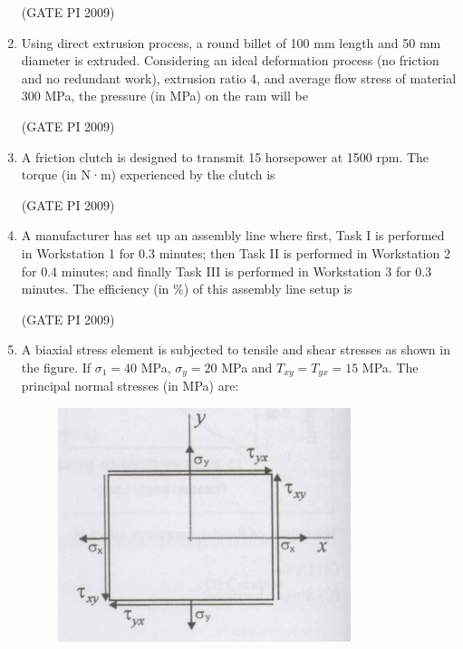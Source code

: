 \documentclass[journal,12pt,onecolumn]{IEEEtran}
\theoremstyle{remark}
\begin{document}
\begin{enumerate}
\hfill (GATE PI 2009)
\item Using direct extrusion process, a round billet of 100 mm length and 50 mm diameter is extruded. Considering an ideal deformation process (no friction and no redundant work), extrusion ratio 4, and average flow stress of material 300 MPa, the pressure (in MPa) on the ram will be
\begin{enumerate}
\end{enumerate}
\hfill (GATE PI 2009)
\item A friction clutch is designed to transmit 15 horsepower at 1500 rpm. The torque (in N·m) experienced by the clutch is
\begin{enumerate}
\end{enumerate}
\hfill (GATE PI 2009)
\item A manufacturer has set up an assembly line where first, Task I is performed in Workstation 1 for 0.3 minutes; then Task II is performed in Workstation 2 for 0.4 minutes; and finally Task III is performed in Workstation 3 for 0.3 minutes. The efficiency (in \%) of this assembly line setup is
\begin{enumerate}
\end{enumerate}
\hfill (GATE PI 2009)

\item A biaxial stress element is subjected to tensile and shear stresses as shown in the figure. If $\sigma_1 = 40$ MPa, $\sigma_y = 20$ MPa and $T_{xy} = T_{yx} = 15$ MPa. The principal normal stresses (in MPa) are:

\begin{figure}[h]
    \centering
    \includegraphics[width=0.5\linewidth]{figs/2.png}
    \label{fig:placeholder}
\end{figure} 


\end{enumerate}
\end{document}
